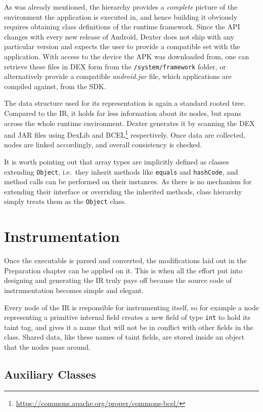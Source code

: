 \documentclass[12pt,twoside,notitlepage]{report}
\newcommand{\weblink}[1] {\footnote{\scriptsize\url{#1}}}
\begin{document}
As was already mentioned, the hierarchy provides a \emph{complete} picture of the environment the application is executed in, and hence building it obviously requires obtaining class definitions of the runtime framework. Since the API changes with every new release of Android, Dexter does not ship with any particular version and expects the user to provide a compatible set with the application. With access to the device the APK was downloaded from, one can retrieve these files in DEX form from the \verb$/system/framework$ folder, or alternatively provide a compatible \emph{android.jar} file, which applications are compiled against, from the SDK. 

The data structure used for its representation is again a standard rooted tree. Compared to the IR, it holds far less information about its nodes, but spans across the whole runtime environment. Dexter generates it by scanning the DEX and JAR files using DexLib and BCEL\weblink{https://commons.apache.org/proper/commons-bcel/} respectively. Once data are collected, nodes are linked accordingly, and overall consistency is checked.

It is worth pointing out that array types are implicitly defined as classes extending \verb$Object$, i.e.\ they inherit methods like \verb$equals$ and \verb$hashCode$, and method calls can be performed on their instances. As there is no mechanism for extending their interface or overriding the inherited methods, class hierarchy simply treats them as the \verb$Object$ class.

\section{Instrumentation}

Once the executable is parsed and converted, the modifications laid out in the Preparation chapter can be applied on it. This is when all the effort put into designing and generating the IR truly pays off because the source code of instrumentation becomes simple and elegant. 

Every node of the IR is responsible for instrumenting itself, so for example a node representing a primitive internal field creates a new field of type \verb$int$ to hold its taint tag, and gives it a name that will not be in conflict with other fields in the class. Shared data, like these names of taint fields, are stored inside an object that the nodes pass around.

\subsection{Auxiliary Classes}
\end{document}
